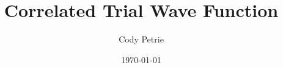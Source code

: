 \documentclass{beamer}
\begin{document}
\title{Correlated Trial Wave Function}
\author{Cody Petrie} 
\date{\today} 

\renewcommand{\O}{\mathcal{O}}
\newcommand{\Oi}{\mathcal{O}_{i}}
\newcommand{\Oij}{\mathcal{O}_{ij}}
\newcommand{\Okl}{\mathcal{O}_{kl}}
\newcommand{\Oijp}{\mathcal{O}^p_{ij}}
\newcommand{\Oklp}{\mathcal{O}^p_{kl}}
\newcommand{\ket}[1]{\left| #1 \right>}
\newcommand{\bra}[1]{\left< #1 \right|}
\newcommand{\braket}[2]{\left< #1 | #2 \right>}
\newcommand{\ketbra}[2]{\left| #1 \right> \left< #2 \right|}
\newcommand{\taui}{\bm{\tau}_i}
\newcommand{\tauj}{\bm{\tau}_j}
\newcommand{\sigmai}{\bm{\sigma}_i}
\newcommand{\sigmaj}{\bm{\sigma}_j}
\newcommand{\rij}{\hat{r}_{ij}}
\newcommand{\sigmaia}{\sigma_{i\alpha}}
\newcommand{\sigmaib}{\sigma_{i\beta}}
\newcommand{\tauig}{\tau_{i\gamma}}
\newcommand{\sigmaja}{\sigma_{j\alpha}}
\newcommand{\sigmajb}{\sigma_{j\beta}}
\newcommand{\taujg}{\tau_{j\gamma}}
\newcommand{\tauij}{\taui \cdot \tauj}
\newcommand{\sigmaij}{\sigmai \cdot \sigmaj}
\newcommand{\mycolor}[1]{\textit{\textcolor{red}{#1}}}
\newcommand{\longsi}{s_1, \ldots, s_{i-1} , s, s_{i+1}, \ldots, s_A}
\newcommand{\longsij}{s_1, \ldots, s_{i-1} , s, s_{i+1}, \ldots, s_{j-1}, s', s_{j+1}, \ldots ,s_A}
\newcommand{\longskl}{s_1, \ldots, s_{k-1} , s, s_{k+1}, \ldots, s_{l-1}, s', s_{l+1}, \ldots ,s_A}
\newcommand{\Ot}{\mathcal{O}^\tau_{n\alpha}}
\newcommand{\Os}{\mathcal{O}^\sigma_{n}}
\newcommand{\Ost}{\mathcal{O}^{\sigma\tau}_{n\alpha}}
\newcommand{\detr}{\mathrm{det}}
\newcommand{\RS}{\mathrm{RS}}

\frame{\titlepage} 
\end{document}
